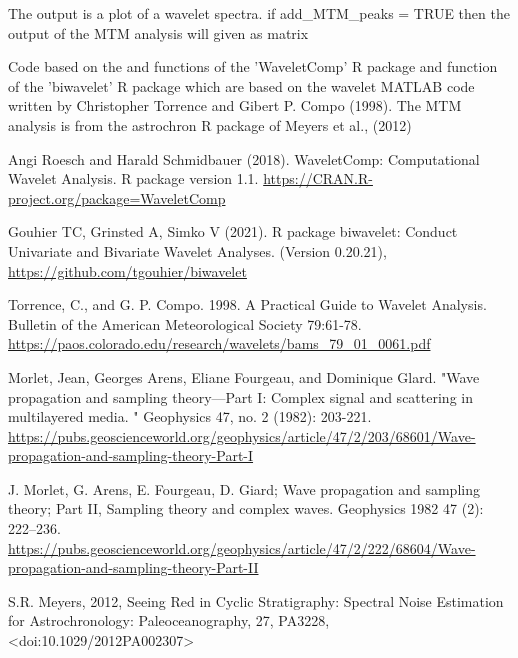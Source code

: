 \documentclass[a4paper]{book}
\begin{document}
%
\begin{Value}
The output is a plot of a wavelet spectra.
if add\_MTM\_peaks = TRUE then the output of the MTM analysis will given as matrix
\end{Value}
%
\begin{Author}
Code based on the  and  functions of the 'WaveletComp' R package
and  function of the 'biwavelet' R package which are based on the
wavelet MATLAB code written by Christopher Torrence and Gibert P. Compo (1998).
The MTM analysis is from the astrochron R package of Meyers et al., (2012)
\end{Author}
%
\begin{References}
Angi Roesch and Harald Schmidbauer (2018). WaveletComp: Computational
Wavelet Analysis. R package version 1.1.
\url{https://CRAN.R-project.org/package=WaveletComp}

Gouhier TC, Grinsted A, Simko V (2021). R package biwavelet: Conduct Univariate and Bivariate Wavelet Analyses. (Version 0.20.21),
\url{https://github.com/tgouhier/biwavelet}

Torrence, C., and G. P. Compo. 1998. A Practical Guide to Wavelet Analysis.
Bulletin of the American Meteorological Society 79:61-78.
\url{https://paos.colorado.edu/research/wavelets/bams_79_01_0061.pdf}

Morlet, Jean, Georges Arens, Eliane Fourgeau, and Dominique Glard.
"Wave propagation and sampling theory—Part I: Complex signal and scattering in multilayered media.
" Geophysics 47, no. 2 (1982): 203-221.
\url{https://pubs.geoscienceworld.org/geophysics/article/47/2/203/68601/Wave-propagation-and-sampling-theory-Part-I}

J. Morlet, G. Arens, E. Fourgeau, D. Giard;
Wave propagation and sampling theory; Part II, Sampling theory and complex waves.
Geophysics 1982 47 (2): 222–236. \url{https://pubs.geoscienceworld.org/geophysics/article/47/2/222/68604/Wave-propagation-and-sampling-theory-Part-II}

S.R. Meyers, 2012, Seeing Red in Cyclic Stratigraphy: Spectral Noise Estimation for
Astrochronology: Paleoceanography, 27, PA3228, <doi:10.1029/2012PA002307>
\end{References}
%
\end{document}
